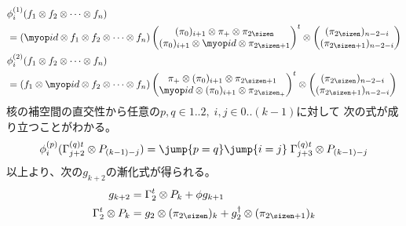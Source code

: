 	\begin{equation}\label{eq:phiの定義その二}\begin{split} %
		&\phi_{i}^{(1)}(f_1\otimes f_2\otimes\cdots\otimes f_n) \\
		&= (\id\otimes f_1\otimes f_2\otimes\cdots\otimes f_n)
		\begin{pmatrix}
			(\pi_0)_{i+1}\otimes\pi_+\otimes\pi_\myeven \\
			(\pi_0)_{i+1}\otimes\id\otimes\pi_\myodd \\
		\end{pmatrix}^t\otimes \begin{pmatrix}
			(\pi_\myeven)_{n-2-i} \\
			(\pi_\myodd)_{n-2-i} \\
		\end{pmatrix} \\
		&\phi_{i}^{(2)}(f_1\otimes f_2\otimes\cdots\otimes f_n) \\
		&= (f_1\otimes \id\otimes f_2\otimes\cdots\otimes f_n)
		\begin{pmatrix}
			\pi_+\otimes(\pi_0)_{i+1}\otimes\pi_\myodd \\
			\id\otimes(\pi_0)_{i+1}\otimes\pi_{\myeven_+} \\
		\end{pmatrix}^t\otimes \begin{pmatrix}
			(\pi_\myeven)_{n-2-i} \\
			(\pi_\myodd)_{n-2-i} \\
		\end{pmatrix}
	\end{split}\end{equation} %
	核の補空間の直交性から任意の$p,q\in1..2,\;i,j\in0..(k-1)$に対して
	次の式が成り立つことがわかる。
	\begin{equation*}\begin{split} %
		\phi_{i}^{(p)}(\Gamma_{j+2}^{(q)t}\otimes P_{(k-1)-j})
		&= \jump{p=q}\jump{i=j}\;\Gamma_{j+3}^{(q)t}\otimes P_{(k-1)-j} \\
	\end{split}\end{equation*} %
	以上より、次の$g_{k+2}$の漸化式が得られる。
	\begin{equation}\label{eq:gの漸化式その二}\begin{split} %
		g_{k+2} &= \Gamma_2^t\otimes P_k + \phi g_{k+1} \\
		\Gamma_2^t\otimes P_k &= g_2\otimes(\pi_\myeven)_k 
			+ g_2^\dag\otimes(\pi_\myodd)_k
	\end{split}\end{equation} %

